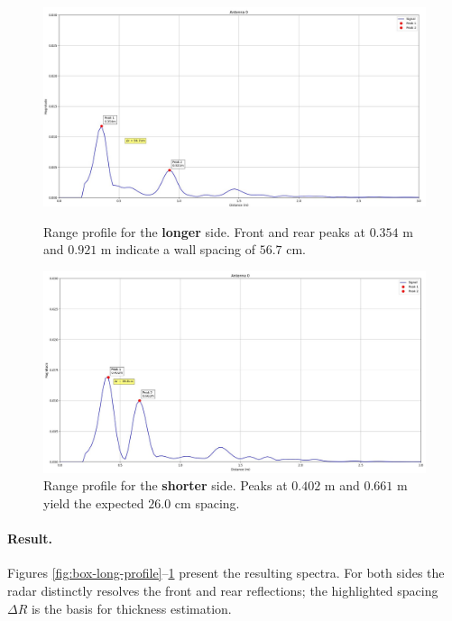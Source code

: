 \begin{figure}[H]
    \centering
    \begin{minipage}[t]{0.6\linewidth}
        \centering
        \includegraphics[width=\linewidth]{Src/images/mox_measurmentL.jpg}
        \caption{Range profile for the \textbf{longer} side.  
                 Front and rear peaks at \(0.354\) m and \(0.921\) m indicate a wall spacing of \(56.7\) cm.}
        \label{fig:box-long-profile}
    \end{minipage}\hfill
    \begin{minipage}[t]{0.6\linewidth}
        \centering
        \includegraphics[width=\linewidth]{Src/chapters/mox_measurmentS.jpg}
        \caption{Range profile for the \textbf{shorter} side.  
                 Peaks at \(0.402\) m and \(0.661\) m yield the expected \(26.0\) cm spacing.}
        \label{fig:box-short-profile}
    \end{minipage}
\end{figure}

\paragraph{Result.}
Figures \ref{fig:box-long-profile}–\ref{fig:box-short-profile} present the resulting spectra.
For both sides the radar distinctly resolves the front and rear reflections; the highlighted spacing \(\Delta R\) is the basis for thickness estimation.

